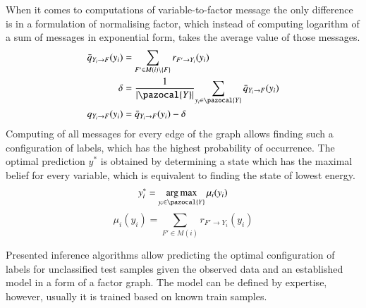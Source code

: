 When it comes to computations of variable-to-factor message the only difference is in a formulation of normalising factor, which instead of computing logarithm of a sum of messages in exponential form, takes the average value of those messages. 
\begin{align}
    \bar{q}_{Y_i\rightarrow F}(y_i) &= \sum_{F' \in M(i) \setminus \left \{ F \right \} }{ r_{F' \rightarrow Y_i}(y_i)} \\
    \delta &= \frac{1}{\left |\pazocal{Y} \right |}{\sum_{y_i \in \pazocal{Y}}{\bar{q}_{Y_i\rightarrow F}(y_i)}} \\
    q_{Y_i\rightarrow F}(y_i) &= \bar{q}_{Y_i\rightarrow F}(y_i) - \delta
\end{align}
Computing of all messages for every edge of the graph allows finding such a configuration of labels, which has the highest probability of occurrence. The optimal prediction $y^*$ is obtained by determining a state which has the maximal belief for every variable, which is equivalent to finding the state of lowest energy.
\begin{equation}
   y_{i}^{*} = \argmax_{y_i \in \pazocal{Y}}{\mu_i (y_i)}
\end{equation}
\begin{equation}
   \mu_i (y_i) = \sum_{F' \in M(i)}{ r_{F' \rightarrow Y_i}(y_i)}
\end{equation}

Presented inference algorithms allow predicting the optimal configuration of labels for unclassified test samples given the observed data and an established model in a form of a factor graph. The model can be defined by expertise, however, usually it is trained based on known train samples.